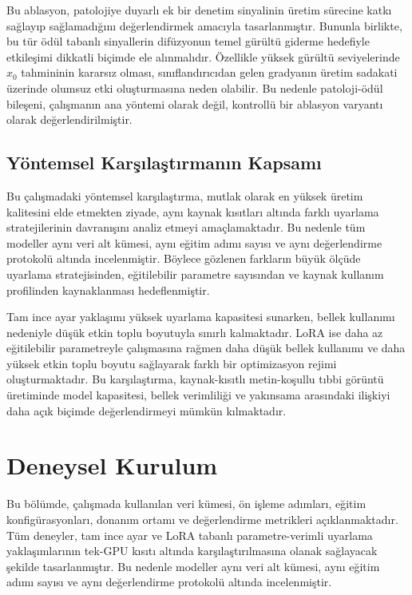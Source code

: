 \documentclass[11pt]{article}
\begin{document}
Bu ablasyon, patolojiye duyarlı ek bir denetim sinyalinin üretim sürecine
katkı sağlayıp sağlamadığını değerlendirmek amacıyla tasarlanmıştır. Bununla
birlikte, bu tür ödül tabanlı sinyallerin difüzyonun temel gürültü giderme
hedefiyle etkileşimi dikkatli biçimde ele alınmalıdır. Özellikle yüksek gürültü
seviyelerinde $\hat{x}_0$ tahmininin kararsız olması, sınıflandırıcıdan gelen
gradyanın üretim sadakati üzerinde olumsuz etki oluşturmasına neden olabilir.
Bu nedenle patoloji-ödül bileşeni, çalışmanın ana yöntemi olarak değil,
kontrollü bir ablasyon varyantı olarak değerlendirilmiştir.

\subsection{Yöntemsel Karşılaştırmanın Kapsamı}

Bu çalışmadaki yöntemsel karşılaştırma, mutlak olarak en yüksek üretim kalitesini
elde etmekten ziyade, aynı kaynak kısıtları altında farklı uyarlama
stratejilerinin davranışını analiz etmeyi amaçlamaktadır. Bu nedenle tüm
modeller aynı veri alt kümesi, aynı eğitim adımı sayısı ve aynı değerlendirme
protokolü altında incelenmiştir. Böylece gözlenen farkların büyük ölçüde
uyarlama stratejisinden, eğitilebilir parametre sayısından ve kaynak kullanım
profilinden kaynaklanması hedeflenmiştir.

Tam ince ayar yaklaşımı yüksek uyarlama kapasitesi sunarken, bellek kullanımı
nedeniyle düşük etkin toplu boyutuyla sınırlı kalmaktadır. LoRA ise daha az
eğitilebilir parametreyle çalışmasına rağmen daha düşük bellek kullanımı ve daha
yüksek etkin toplu boyutu sağlayarak farklı bir optimizasyon rejimi
oluşturmaktadır. Bu karşılaştırma, kaynak-kısıtlı metin-koşullu tıbbi görüntü
üretiminde model kapasitesi, bellek verimliliği ve yakınsama arasındaki ilişkiyi
daha açık biçimde değerlendirmeyi mümkün kılmaktadır.


\section{Deneysel Kurulum}
\label{sec:setup}

Bu bölümde, çalışmada kullanılan veri kümesi, ön işleme adımları, eğitim
konfigürasyonları, donanım ortamı ve değerlendirme metrikleri açıklanmaktadır.
Tüm deneyler, tam ince ayar ve LoRA tabanlı parametre-verimli uyarlama
yaklaşımlarının tek-GPU kısıtı altında karşılaştırılmasına olanak sağlayacak
şekilde tasarlanmıştır. Bu nedenle modeller aynı veri alt kümesi, aynı eğitim
adımı sayısı ve aynı değerlendirme protokolü altında incelenmiştir.
\end{document}
